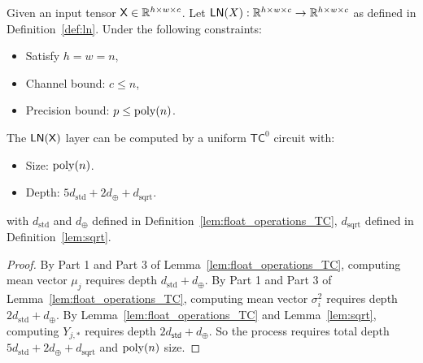 \begin{lemma}\label{lem:ln_tc0_formal}
    Given an input tensor $\mathsf{X} \in \mathbb{R}^{h \times w \times c}$. Let $\mathsf{LN}(X):\mathbb{R}^{h \times w \times c} \to \mathbb{R}^{h \times w \times c}$ as defined in Definition~\ref{def:ln}. Under the following constraints:
    \begin{itemize}
         \item Satisfy $h = w = n$,
         \item Channel bound: $c \leq n$,
         \item Precision bound: $p \leq \operatorname{poly}(n)$.
     \end{itemize}
     The $\mathsf{LN}(\mathsf{X})$ layer can be computed by a uniform $\mathsf{TC}^0$ circuit with:
     \begin{itemize}
        \item Size: $\operatorname{poly}(n)$.
        \item Depth: $5d_\mathrm{std} + 2d_{\oplus} + d_\mathrm{sqrt}$.
     \end{itemize}    
     with $d_{\mathrm{std}}$ and $d_{\oplus}$ defined in Definition~\ref{lem:float_operations_TC}, $d_{\mathrm{sqrt}}$ defined in Definition~\ref{lem:sqrt}.
\end{lemma}

\begin{proof}
    By Part 1 and Part 3  of Lemma~\ref{lem:float_operations_TC}, 
    computing mean vector $\mu_j$ requires depth $d_{\mathrm{std}}+d_{\oplus}$. By Part 1 and Part 3  of Lemma~\ref{lem:float_operations_TC}, 
    computing mean vector $\sigma^2_i$ requires depth $2d_{\mathrm{std}}+d_{\oplus}$.      By Lemma~\ref{lem:float_operations_TC} and Lemma~\ref{lem:sqrt}, computing $Y_{j,*}$ requires depth  $2d_{\mathsf{std}}+d_{\oplus}$. So the process requires total depth $5d_\mathrm{std} + 2d_{\oplus} + d_\mathrm{sqrt}$ and $\operatorname{poly}(n)$ size. 
\end{proof}